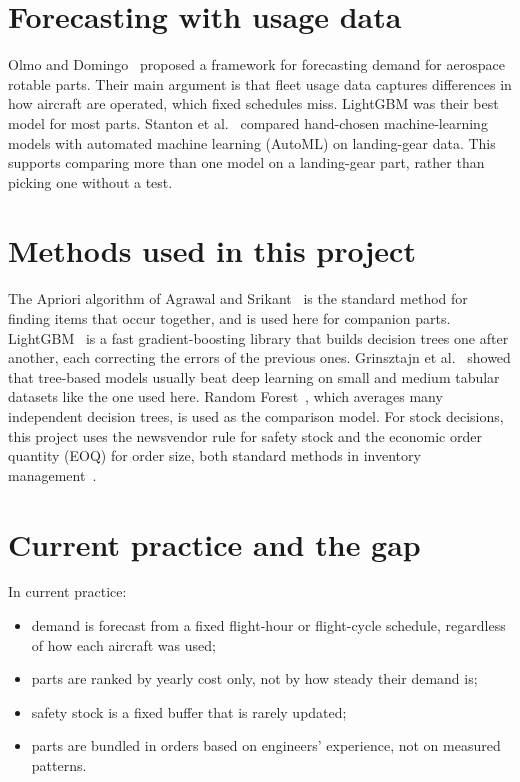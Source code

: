 \documentclass[12pt,oneside]{report}
\begin{document}
\section{Forecasting with usage data}
Olmo and Domingo~\cite{olmo2026} proposed a framework for forecasting demand for aerospace rotable parts. Their main argument is that fleet usage data captures differences in how aircraft are operated, which fixed schedules miss. LightGBM was their best model for most parts. Stanton et al.~\cite{stanton2025} compared hand-chosen machine-learning models with automated machine learning (AutoML) on landing-gear data. This supports comparing more than one model on a landing-gear part, rather than picking one without a test.

\section{Methods used in this project}
The Apriori algorithm of Agrawal and Srikant~\cite{agrawal1994} is the standard method for finding items that occur together, and is used here for companion parts. LightGBM~\cite{ke2017} is a fast gradient-boosting library that builds decision trees one after another, each correcting the errors of the previous ones. Grinsztajn et al.~\cite{grinsztajn2022} showed that tree-based models usually beat deep learning on small and medium tabular datasets like the one used here. Random Forest~\cite{breiman2001}, which averages many independent decision trees, is used as the comparison model. For stock decisions, this project uses the newsvendor rule for safety stock and the economic order quantity (EOQ) for order size, both standard methods in inventory management~\cite{silver2017,harris1913}.

\section{Current practice and the gap}
In current practice:
\begin{itemize}
\item demand is forecast from a fixed flight-hour or flight-cycle schedule, regardless of how each aircraft was used;
\item parts are ranked by yearly cost only, not by how steady their demand is;
\item safety stock is a fixed buffer that is rarely updated;
\item parts are bundled in orders based on engineers' experience, not on measured patterns.
\end{itemize}
\end{document}
